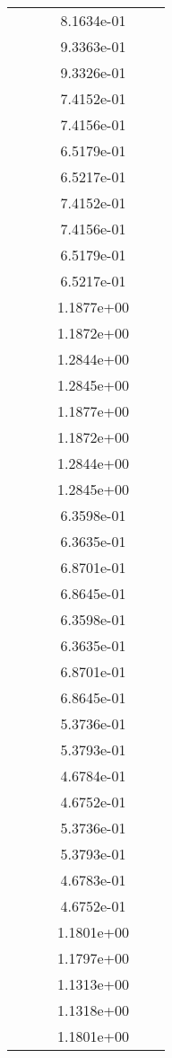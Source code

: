 \begin{xltabular}{\textwidth}{r|rS[table-format=1.3e+2]S[table-format=1.4e+2]S[table-format=1.4e+2]S[table-format=-1.5]}
&  &  & 8.1634e-01 & & \\
&  &  & 9.3363e-01 & & \\
&  &  & 9.3326e-01 & & \\
&  &  & 7.4152e-01 & & \\
&  &  & 7.4156e-01 & & \\
&  &  & 6.5179e-01 & & \\
&  &  & 6.5217e-01 & & \\
&  &  & 7.4152e-01 & & \\
&  &  & 7.4156e-01 & & \\
&  &  & 6.5179e-01 & & \\
&  &  & 6.5217e-01 & & \\
&  &  & 1.1877e+00 & & \\
&  &  & 1.1872e+00 & & \\
&  &  & 1.2844e+00 & & \\
&  &  & 1.2845e+00 & & \\
&  &  & 1.1877e+00 & & \\
&  &  & 1.1872e+00 & & \\
&  &  & 1.2844e+00 & & \\
&  &  & 1.2845e+00 & & \\
&  &  & 6.3598e-01 & & \\
&  &  & 6.3635e-01 & & \\
&  &  & 6.8701e-01 & & \\
&  &  & 6.8645e-01 & & \\
&  &  & 6.3598e-01 & & \\
&  &  & 6.3635e-01 & & \\
&  &  & 6.8701e-01 & & \\
&  &  & 6.8645e-01 & & \\
&  &  & 5.3736e-01 & & \\
&  &  & 5.3793e-01 & & \\
&  &  & 4.6784e-01 & & \\
&  &  & 4.6752e-01 & & \\
&  &  & 5.3736e-01 & & \\
&  &  & 5.3793e-01 & & \\
&  &  & 4.6783e-01 & & \\
&  &  & 4.6752e-01 & & \\
&  &  & 1.1801e+00 & & \\
&  &  & 1.1797e+00 & & \\
&  &  & 1.1313e+00 & & \\
&  &  & 1.1318e+00 & & \\
&  &  & 1.1801e+00 & & \\

\end{xltabular}
